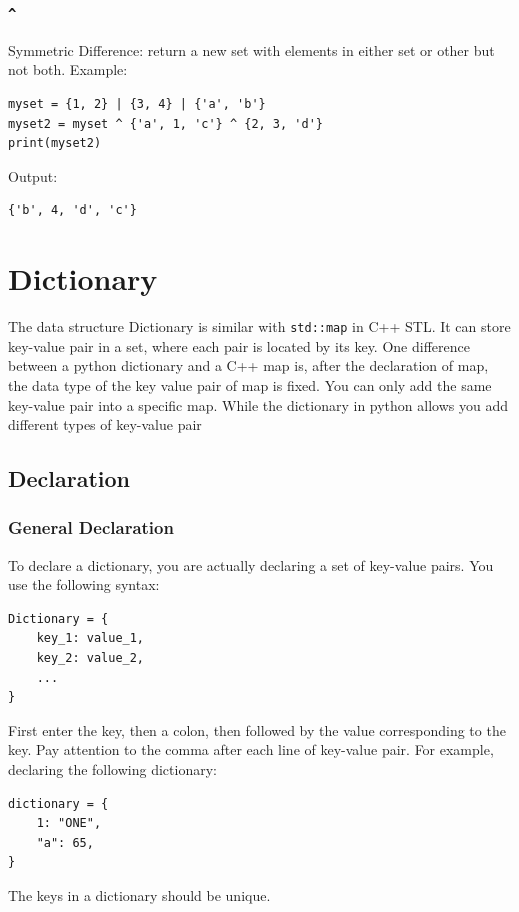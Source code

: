 \documentclass[12pt]{book}
\begin{document}
\subsubsection{\texttt{\textasciicircum{}}}
\label{sec:orgef1ec96}
Symmetric Difference: return a new set with elements in either set or other but not both. Example:
\begin{verbatim}
myset = {1, 2} | {3, 4} | {'a', 'b'}
myset2 = myset ^ {'a', 1, 'c'} ^ {2, 3, 'd'}
print(myset2)
\end{verbatim}
Output:
\begin{verbatim}
{'b', 4, 'd', 'c'}
\end{verbatim}

\section{Dictionary}
\label{sec:orgf5ec6c9}
The data structure Dictionary is similar with \texttt{std::map} in C++ STL. It can store key-value pair in a set, where each pair is located by its key. One difference between a python dictionary and a C++ map is, after the declaration of map, the data type of the key value pair of map is fixed. You can only add the same key-value pair into a specific map. While the dictionary in python allows you add different types of key-value pair
\subsection{Declaration}
\label{sec:orgcda2f9f}
\subsubsection{General Declaration}
\label{sec:org701ea57}
To declare a dictionary, you are actually declaring a set of key-value pairs. You use the following syntax:
\begin{verbatim}
Dictionary = {
    key_1: value_1,
    key_2: value_2,
    ...
}
\end{verbatim}
First enter the key, then a colon, then followed by the value corresponding to the key. Pay attention to the comma after each line of key-value pair. For example, declaring the following dictionary:
\begin{verbatim}
dictionary = {
    1: "ONE",
    "a": 65,
}
\end{verbatim}
The keys in a dictionary should be unique.
\end{document}

